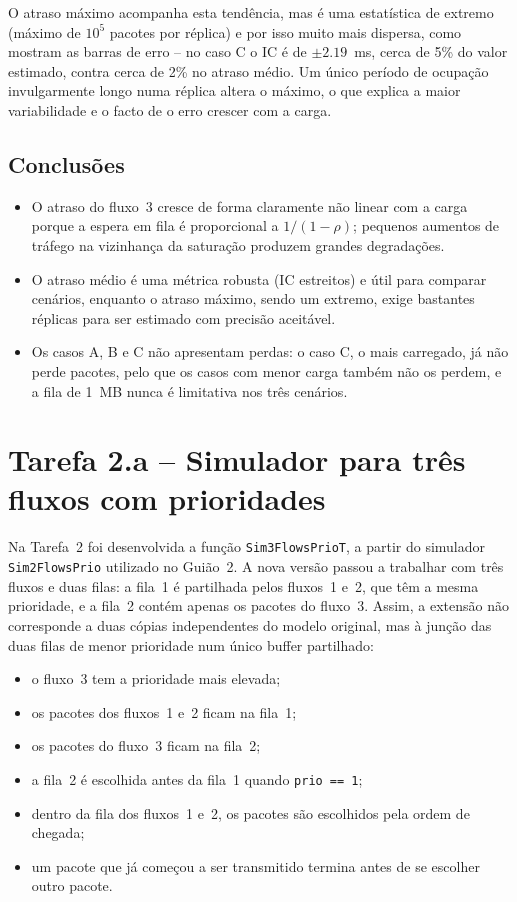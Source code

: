 \documentclass[11pt,a4paper]{article}
\begin{document}
O atraso máximo acompanha esta tendência, mas é uma estatística de extremo
(máximo de $10^5$ pacotes por réplica) e por isso muito mais dispersa, como
mostram as barras de erro -- no caso C o IC é de $\pm2.19$~ms, cerca de 5\% do
valor estimado, contra cerca de 2\% no atraso médio. Um único período de
ocupação invulgarmente longo numa réplica altera o máximo, o que explica a
maior variabilidade e o facto de o erro crescer com a carga.

\subsection*{Conclusões}

\begin{itemize}
    \item O atraso do fluxo~3 cresce de forma claramente não linear com a carga
    porque a espera em fila é proporcional a $1/(1-\rho)$; pequenos aumentos de
    tráfego na vizinhança da saturação produzem grandes degradações.
    \item O atraso médio é uma métrica robusta (IC estreitos) e útil para
    comparar cenários, enquanto o atraso máximo, sendo um extremo, exige
    bastantes réplicas para ser estimado com precisão aceitável.
    \item Os casos A, B e C não apresentam perdas: o caso C, o mais carregado,
    já não perde pacotes, pelo que os casos com menor carga também não os
    perdem, e a fila de 1~MB nunca é limitativa nos três cenários.
\end{itemize}

\newpage



\section{Tarefa 2.a -- Simulador para três fluxos com prioridades}

Na Tarefa~2 foi desenvolvida a função \texttt{Sim3FlowsPrioT}, a partir do
simulador \texttt{Sim2FlowsPrio} utilizado no Guião~2. A nova versão passou
a trabalhar com três fluxos e duas filas: a fila~1 é partilhada pelos
fluxos~1 e~2, que têm a mesma prioridade, e a fila~2 contém apenas os pacotes
do fluxo~3. Assim, a extensão não corresponde a duas cópias independentes do
modelo original, mas à junção das duas filas de menor prioridade num único
buffer partilhado:

\begin{itemize}
    \item o fluxo~3 tem a prioridade mais elevada;
    \item os pacotes dos fluxos~1 e~2 ficam na fila~1;
    \item os pacotes do fluxo~3 ficam na fila~2;
    \item a fila~2 é escolhida antes da fila~1 quando \texttt{prio == 1};
    \item dentro da fila dos fluxos~1 e~2, os pacotes são escolhidos pela
    ordem de chegada;
    \item um pacote que já começou a ser transmitido termina antes de se
    escolher outro pacote.
\end{itemize}
\end{document}
